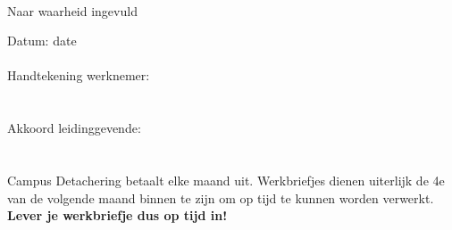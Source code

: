 \documentclass[a4paper,twoside]{article}
\begin{document}
		\paragraph{}
			
			Naar waarheid ingevuld
			
			Datum: {{ date }}
			
		\paragraph{}
			
			Handtekening werknemer: 
			\\
			\\
		\paragraph{}
			
			Akkoord leidinggevende: 
			\\
			\\
		\paragraph{}
			
			Campus Detachering betaalt elke maand uit. Werkbriefjes dienen uiterlijk de 4e van de volgende maand binnen te zijn om op tijd te kunnen worden verwerkt. {\bfseries Lever je werkbriefje dus op tijd in!}
			
\end{document}
